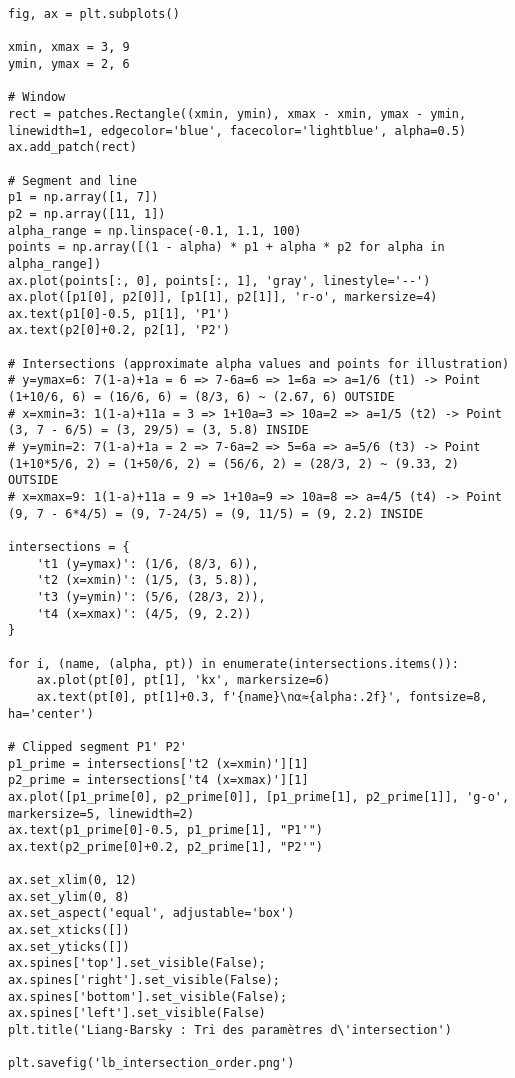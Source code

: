 \documentclass{article}
\begin{document}
{\begin{verbatim}
fig, ax = plt.subplots()

xmin, xmax = 3, 9
ymin, ymax = 2, 6

# Window
rect = patches.Rectangle((xmin, ymin), xmax - xmin, ymax - ymin, linewidth=1, edgecolor='blue', facecolor='lightblue', alpha=0.5)
ax.add_patch(rect)

# Segment and line
p1 = np.array([1, 7])
p2 = np.array([11, 1])
alpha_range = np.linspace(-0.1, 1.1, 100)
points = np.array([(1 - alpha) * p1 + alpha * p2 for alpha in alpha_range])
ax.plot(points[:, 0], points[:, 1], 'gray', linestyle='--')
ax.plot([p1[0], p2[0]], [p1[1], p2[1]], 'r-o', markersize=4)
ax.text(p1[0]-0.5, p1[1], 'P1')
ax.text(p2[0]+0.2, p2[1], 'P2')

# Intersections (approximate alpha values and points for illustration)
# y=ymax=6: 7(1-a)+1a = 6 => 7-6a=6 => 1=6a => a=1/6 (t1) -> Point (1+10/6, 6) = (16/6, 6) = (8/3, 6) ~ (2.67, 6) OUTSIDE
# x=xmin=3: 1(1-a)+11a = 3 => 1+10a=3 => 10a=2 => a=1/5 (t2) -> Point (3, 7 - 6/5) = (3, 29/5) = (3, 5.8) INSIDE
# y=ymin=2: 7(1-a)+1a = 2 => 7-6a=2 => 5=6a => a=5/6 (t3) -> Point (1+10*5/6, 2) = (1+50/6, 2) = (56/6, 2) = (28/3, 2) ~ (9.33, 2) OUTSIDE
# x=xmax=9: 1(1-a)+11a = 9 => 1+10a=9 => 10a=8 => a=4/5 (t4) -> Point (9, 7 - 6*4/5) = (9, 7-24/5) = (9, 11/5) = (9, 2.2) INSIDE

intersections = {
    't1 (y=ymax)': (1/6, (8/3, 6)),
    't2 (x=xmin)': (1/5, (3, 5.8)),
    't3 (y=ymin)': (5/6, (28/3, 2)),
    't4 (x=xmax)': (4/5, (9, 2.2))
}

for i, (name, (alpha, pt)) in enumerate(intersections.items()):
    ax.plot(pt[0], pt[1], 'kx', markersize=6)
    ax.text(pt[0], pt[1]+0.3, f'{name}\nα≈{alpha:.2f}', fontsize=8, ha='center')

# Clipped segment P1' P2'
p1_prime = intersections['t2 (x=xmin)'][1]
p2_prime = intersections['t4 (x=xmax)'][1]
ax.plot([p1_prime[0], p2_prime[0]], [p1_prime[1], p2_prime[1]], 'g-o', markersize=5, linewidth=2)
ax.text(p1_prime[0]-0.5, p1_prime[1], "P1'")
ax.text(p2_prime[0]+0.2, p2_prime[1], "P2'")

ax.set_xlim(0, 12)
ax.set_ylim(0, 8)
ax.set_aspect('equal', adjustable='box')
ax.set_xticks([])
ax.set_yticks([])
ax.spines['top'].set_visible(False); ax.spines['right'].set_visible(False); ax.spines['bottom'].set_visible(False); ax.spines['left'].set_visible(False)
plt.title('Liang-Barsky : Tri des paramètres d\'intersection')

plt.savefig('lb_intersection_order.png')
\end{verbatim}

}
\end{document}
